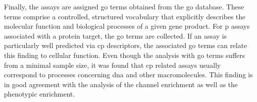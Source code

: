 Finally, the assays are assigned \ac{go} terms obtained from the \ac{go} database.\cite{Ashburner2000,Carbon2020} These terms comprise a controlled, structured vocabulary that explicitly describes the molecular function and biological processes of a given gene product. For \acl{p} assays associated with a protein target, the \ac{go} terms are collected. If an assay is particularly well predicted via \ac{cp} descriptors, the associated \ac{go} terms can relate this finding to cellular function. Even though the analysis with go terms suffers from a minimal sample size, it was found that \ac{cp} related assays usually correspond to processes concerning \ac{dna} and other macromolecules. This finding is in good agreement with the analysis of the channel enrichment as well as the phenotypic enrichment.


